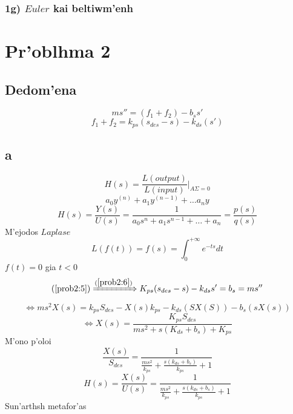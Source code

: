 \documentclass[a4paper]{article}
\begin{document}
        \subsubsection*{1g) $Euler$ kai beltiwm'enh}
        \noindent{}
        \noindent{}
        \noindent{}
        \noindent{}
        \section{Pr'oblhma 2}
        \subsection{Dedom'ena}
        \begin{equation}
            ms''=(f_1+f_2)-b_ss'
            \label{prob2:5}
        \end{equation}
        \begin{equation}
            f_1+f_2=k_{ps}(s_{des}-s)-k_{ds}(s')
            \label{prob2:6}
        \end{equation}
        \subsection{a}
        \[H(s)=\frac{L(output)}{L(input)}\rvert _{A\Sigma=0}\]
        \[a_0y^{(n)}+a_1y^{(n-1)}+\dots a_ny\]
        \[H(s)=\frac{Y(s)}{U(s)}=\frac{1}{a_0s^n+a_1s^{n-1}+\dots+a_n}=\frac{p(s)}{q(s)}\]
        M'ejodos $Laplase$
        \[L(f(t))=f(s)=\int_0^{+\infty}e^{-ts}dt\]
        $f(t)=0$ gia $t<0$
        \[(\ref{prob2:5}) \xRightarrow{(\ref{prob2:6})}K_{ps}(s_{des}-s)-k_{ds}s'=b_s=ms''\]
        \[\Leftrightarrow ms^2X(s)=k_{ps}S_{des}-X(s)k_{ps}-k_{ds}(SX(S))-b_s(sX(s))\]
        \[\Leftrightarrow X(s)=\frac{K_{ps}S_{des}}{ms^2+s(K_{ds}+b_s)+K_{ps}}\]
        \hfill M'ono p'oloi
        \[\frac{X(s)}{S_{des}}=\frac{1}{\frac{ms^2}{k_{ps}}+\frac{s(k_{ds}+b_s)}{k_{ps}}+1}\]
        \[H(s)=\frac{X(s)}{U(s)}=\frac{1}{\frac{ms^2}{k_{ps}}+\frac{s(k_{ds}+b_s)}{k_{ps}}+1}\]\hfill Sun'arthsh metafor'as
\end{document}

